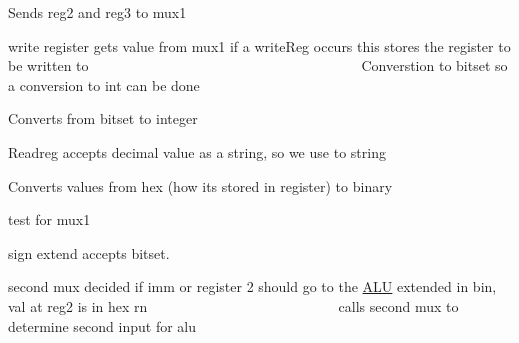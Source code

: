 Sends reg2 and reg3 to mux1

write register gets value from mux1 if a write\+Reg occurs this stores the register to be written to ~\newline
~\newline
~\newline
~\newline
~\newline
~\newline
~\newline
~\newline
~\newline
~\newline
~\newline
~\newline
~\newline
~\newline
~\newline
~\newline
~\newline
~\newline
~\newline
~\newline
~\newline
~\newline
~\newline
 Converstion to bitset so a conversion to int can be done

Converts from bitset to integer

Readreg accepts decimal value as a string, so we use to string

Converts values from hex (how its stored in register) to binary

test for mux1

sign extend accepts bitset.

second mux decided if imm or register 2 should go to the \mbox{\hyperlink{class_a_l_u}{A\+LU}} extended in bin, val at reg2 is in hex rn ~\newline
~\newline
~\newline
~\newline
~\newline
~\newline
~\newline
~\newline
~\newline
~\newline
~\newline
~\newline
~\newline
~\newline
~\newline
~\newline
 calls second mux to determine second input for alu

